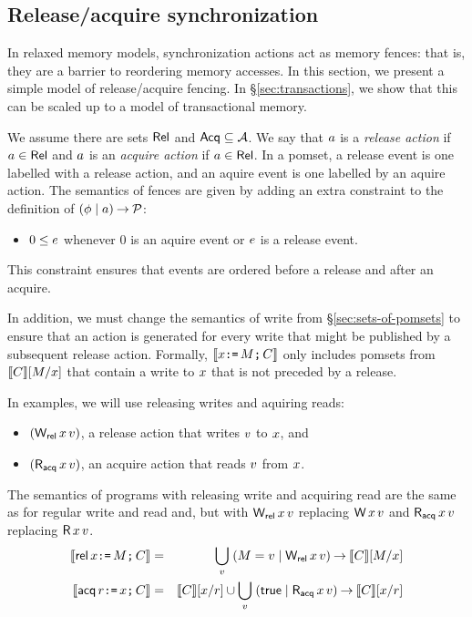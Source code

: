 \subsection{Release/acquire synchronization}
\label{sec:ra}

In relaxed memory models, synchronization actions act as memory fences: that
is, they are a barrier to reordering memory accesses.  In this section, we
present a simple model of release/acquire fencing. In
\S\ref{sec:transactions}, we show that this can be scaled up to a model of
transactional memory.

We assume there are sets $\mathsf{Rel}$ and $\mathsf{Acq} \subseteq\mathcal{A}$.  We say that
$a$ is a \emph{release action} if $a\in\mathsf{Rel}$ and $a$ is an
\emph{acquire action} if $a\in\mathsf{Rel}$.
In a pomset, a release event is one labelled with a release action,
and an aquire event is one labelled by an aquire action.
The semantics of fences are given by adding an extra constraint
to the definition of $(\phi\mid a)\mathbin\rightarrow\mathcal{P}$:
\begin{itemize}
\item $0 \le e$ whenever $0$ is an aquire event or $e$ is a release event.
\end{itemize}
This constraint ensures that events are ordered before a
release and after an acquire.

In addition, we must change the semantics of write from
\S\ref{sec:sets-of-pomsets} to ensure that an action is generated for every
write that might be published by a subsequent release action.
Formally, $\llbracket x\texttt{:=}\,M\texttt{;}\, C\rrbracket$ only includes pomsets
from $\llbracket C\rrbracket[M/x]$ that contain a write to
$x$ that is not preceded by a release.

In examples, we will use
releasing writes and aquiring reads:
\begin{itemize}
\item $(\DWRel{\aLoc}{\aVal})$, a release action that writes $v$ to $x$, and
\item $(\DRAcq{\aLoc}{\aVal})$, an acquire action that reads $v$ from $x$.
\end{itemize}
The semantics of programs with releasing write and acquiring read are the
same as for regular write and read and, but with $\DWRel\aLoc\aVal$ replacing
$\DW\aLoc\aVal$ and $\DRAcq\aLoc\aVal$ replacing $\DR\aLoc\aVal$.  
\begin{eqnarray*}
  \sem{\REL\aLoc\GETS\aExp\SEMI \aCmd} & = & \bigcup_\aVal\; (\aExp=\aVal \mid \DWRel\aLoc\aVal) \prefix \sem{\aCmd}[\aExp/\aLoc] \\
  \sem{\ACQ\aReg\GETS\aLoc\SEMI \aCmd} & = & \sem{\aCmd}[\aLoc/\aReg] \cup \bigcup_\aVal\; (\TRUE \mid \DRAcq\aLoc\aVal) \prefix \sem{\aCmd}[\aLoc/\aReg] \\
\end{eqnarray*}

